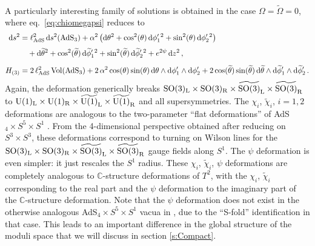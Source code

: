 \documentclass[a4paper, 11pt]{article}
\numberwithin{equation}{section}
\newcommand{\ts}[1]{\widetilde{#1}}
\newcommand{\SO}[1]{\mathrm{SO}( #1 )}
\newcommand{\+}{\oplus}
\renewcommand{\d}{\ensuremath{\mathrm{d}}\xspace}
\begin{document}
\paragraph{}
A particularly interesting family of solutions is obtained in the case $\Omega=\ts{\Omega}=0$, where eq.~\eqref{eq:chiomegapsi} reduces to
\begin{equation} \label{eq:chipsi}
	\begin{split}
		\d s^{2} &= \ell_{\rm AdS}^{2} \,\d s^{2}({\rm AdS}_{3}) +\alpha^{2}\left(\d\theta^{2} + \cos^{2}(\theta)\,\d\phi'_{1}{}^{2} + \sin^{2}(\theta)\,\d\phi'_{2}{}^{2} \right) \\[3pt]
		&\quad +\d\ts{\theta}^{2} + \cos^{2}(\ts{\theta})\,\d\ts{\phi}'_{1}{}^{2} + \sin^{2}(\ts{\theta})\,\d\ts{\phi}'_{2}{}^{2} + e^{2\psi}\,\d z^{2}\,, \\[5pt]
		H_{(3)} &= 2\,\ell_{\rm AdS}^{2}\,{\rm Vol}({\rm AdS_{3}}) + 2\,\alpha^{2}\cos(\theta)\sin(\theta)\,\d\theta\wedge\d\phi'_{1}\wedge\d\phi'_{2}+ 2\cos(\ts{\theta})\sin(\ts{\theta})\,\d\ts{\theta}\wedge\d\ts{\phi}'_{1}\wedge\d\ts{\phi}'_{2}\,.
	\end{split}
\end{equation}
Again, the deformation generically breaks $\SO{3}_{\rm L}\times\SO{3}_{\rm R}\times\ts{\SO{3}}_{\rm L}\times\ts{\SO{3}}_{\rm R}$ to ${\rm U}(1)_{\rm L}\times{\rm U}(1)_{\rm R}\times\ts{{\rm U}(1)}_{\rm L}\times\ts{{\rm U}(1)}_{\rm R}$ and all supersymmetries. The $\chi_i$, $\ts{\chi}_i$, $i = 1, 2$ deformations are analogous to the two-parameter ``flat deformations'' \cite{Guarino:2021hrc} of AdS$_4 \times S^5 \times S^1$ \cite{Giambrone:2021zvp,Giambrone:2021wsm}. From the 4-dimensional perspective obtained after reducing on $S^3 \times S^3$, these deformations correspond to turning on Wilson lines for the $\SO{3}_{\rm L}\times\SO{3}_{\rm R}\times\ts{\SO{3}}_{\rm L}\times\ts{\SO{3}}_{\rm R}$ gauge fields along $S^1$. The $\psi$ deformation is even simpler: it just rescales the $S^1$ radius. These $\chi_i$, $\ts{\chi}_i$, $\psi$ deformations are completely analogous to $\mathbb{C}$-structure deformations of $T^2$, with the $\chi_i$, $\ts{\chi}_i$ corresponding to the real part and the $\psi$ deformation to the imaginary part of the $\mathbb{C}$-structure deformation. Note that the $\psi$ deformation does not exist in the otherwise analogous AdS$_4 \times S^5 \times S^1$ vacua in \cite{Guarino:2021hrc,Giambrone:2021zvp,Giambrone:2021wsm}, due to the ``S-fold'' identification in that case. This leads to an important difference in the global structure of the moduli space that we will discuss in section \ref{s:Compact}.
\end{document}
